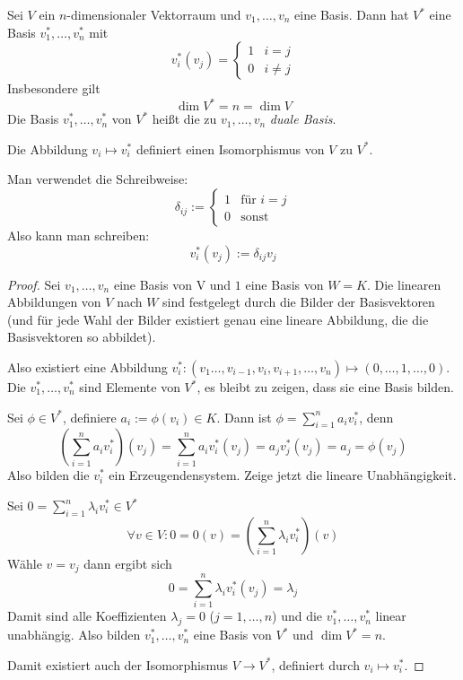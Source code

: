 \documentclass[a4paper, 10pt]{scrbook}
\begin{document}
\begin{prop} \label{prop: 9.2}
Sei $V$ ein $n$-dimensionaler Vektorraum und $v_1,\dotsc,v_n$ eine Basis.
Dann hat $V^*$ eine Basis $v_1^*,\dotsc,v_n^*$ mit
\[
 \boxed{v_i^*(v_j)=\begin{cases}1&i=j\\0&i\neq j\end{cases}}
\]
Insbesondere gilt
\[
	\dim V^*=n = \dim V
\]
Die Basis $v_1^*,\dotsc,v_n^*$ von $V^*$ heißt die zu $v_1,\dotsc,v_n$ \emph{duale Basis}.

Die Abbildung $v_i\mapsto v_i^*$ definiert einen Isomorphismus von $V$ zu $V^*$.
\begin{note}
Man verwendet die Schreibweise:
\[
\delta_{ij} := \begin{cases} 1 & \text{für } i=j\\ 0 &\text{sonst}\end{cases}
\]
Also kann man schreiben:
\[
	v_{i}^*(v_j):=\delta_{ij}v_j
\]
\end{note}


\begin{proof}
Sei $v_1,\dotsc,v_n$ eine Basis von V und $1$ eine Basis von $W=K$.
Die linearen Abbildungen von $V$ nach $W$ sind festgelegt durch die Bilder der Basisvektoren
(und für jede Wahl der Bilder existiert genau eine lineare Abbildung, die die Basisvektoren so abbildet).

Also existiert eine Abbildung $v_i^*: (v_1\dotsc,v_{i-1},v_i,v_{i+1},\dotsc,v_n) \mapsto (0,\dotsc,1,\dotsc,0)$.
Die $v_{1}^*,\dotsc,v_{n}^*$ sind Elemente von $V^*$, es bleibt zu zeigen, dass sie eine Basis bilden.

Sei $\phi\in V^*$, definiere $a_i :=\phi(v_i)\in K$.
Dann ist $\phi=\sum_{i=1}^na_iv_{i}^*$, denn
\[
\left(\sum_{i=1}^na_iv_{i}^*\right)(v_j)
=\sum_{i=1}^na_iv_{i}^*(v_j)
=a_jv_j^*(v_j) = a_j = \phi(v_j)
\]
Also bilden die $v_{i}^*$ ein Erzeugendensystem.
Zeige jetzt die lineare Unabhängigkeit.

Sei $0=\sum_{i=1}^n\lambda_iv_i^* \in V^*$
\[
\forall v\in V: 0=0(v)=\left(\sum_{i=1}^n\lambda_iv_i^*\right)(v)
\]
Wähle $v=v_j$ dann ergibt sich
\[
0=\sum_{i=1}^n\lambda_iv_i^*(v_j)=\lambda_j
\]
Damit sind alle Koeffizienten $\lambda_j=0$ ($j=1,\dotsc,n$) und die $v_1^*,\dotsc,v_n^*$ linear unabhängig. 
Also bilden $v_1^*,\dotsc,v_n^*$ eine Basis von $V^*$ und $\dim V^*=n$.

Damit existiert auch der Isomorphismus $V\to V^*$, definiert durch $v_i\mapsto v_i^*$.
\end{proof}
\end{prop}
\end{document}
